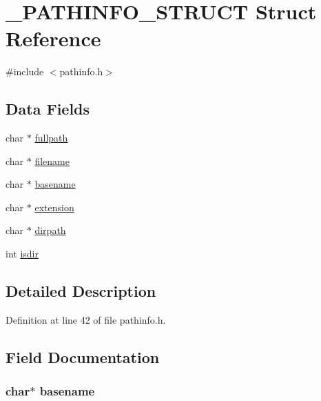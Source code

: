 \hypertarget{struct___p_a_t_h_i_n_f_o___s_t_r_u_c_t}{\section{\-\_\-\-P\-A\-T\-H\-I\-N\-F\-O\-\_\-\-S\-T\-R\-U\-C\-T Struct Reference}
\label{struct___p_a_t_h_i_n_f_o___s_t_r_u_c_t}
}


{\ttfamily \#include $<$pathinfo.\-h$>$}

\subsection*{Data Fields}
\begin{DoxyCompactItemize}
\item 
char $\ast$ \hyperlink{struct___p_a_t_h_i_n_f_o___s_t_r_u_c_t_a6a315eab5902ef72dbd0860f22d48677}{fullpath}
\item 
char $\ast$ \hyperlink{struct___p_a_t_h_i_n_f_o___s_t_r_u_c_t_aeac90097f29f7529968697163cea5c18}{filename}
\item 
char $\ast$ \hyperlink{struct___p_a_t_h_i_n_f_o___s_t_r_u_c_t_afdac556c867ac406846efca7486eefa0}{basename}
\item 
char $\ast$ \hyperlink{struct___p_a_t_h_i_n_f_o___s_t_r_u_c_t_a84bf1fb20854625843d173ca370a6f91}{extension}
\item 
char $\ast$ \hyperlink{struct___p_a_t_h_i_n_f_o___s_t_r_u_c_t_ada18cf0dc761726784c911f0e1797ab6}{dirpath}
\item 
int \hyperlink{struct___p_a_t_h_i_n_f_o___s_t_r_u_c_t_af7391c3fa687229b8224961193e61b0d}{isdir}
\end{DoxyCompactItemize}


\subsection{Detailed Description}


Definition at line 42 of file pathinfo.\-h.



\subsection{Field Documentation}
\hypertarget{struct___p_a_t_h_i_n_f_o___s_t_r_u_c_t_afdac556c867ac406846efca7486eefa0}{
\subsubsection[{basename}]{\setlength{\rightskip}{0pt plus 5cm}char$\ast$ basename}}\label{struct___p_a_t_h_i_n_f_o___s_t_r_u_c_t_afdac556c867ac406846efca7486eefa0}


